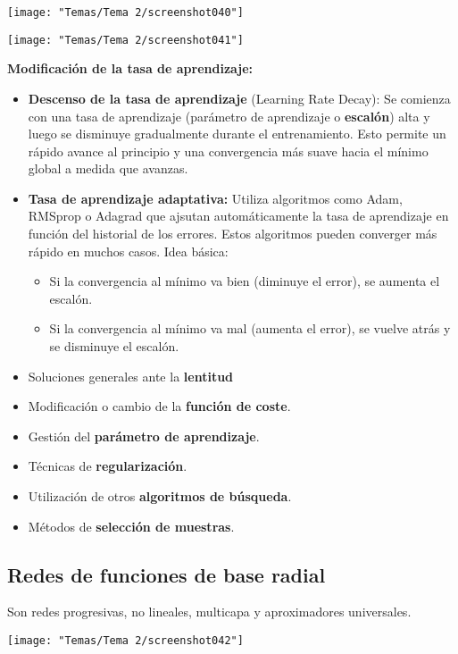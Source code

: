 \begin{center}
	\texttt{[image: "Temas/Tema 2/screenshot040"]}
\end{center}
\begin{center}
	\texttt{[image: "Temas/Tema 2/screenshot041"]}
\end{center}
\textbf{Modificación de la tasa de aprendizaje:}
\begin{itemize}
	\item \textbf{Descenso de la tasa de aprendizaje} (Learning Rate Decay): Se comienza con una tasa de aprendizaje (parámetro de aprendizaje o \textbf{escalón}) alta y luego se disminuye gradualmente durante el entrenamiento. Esto permite un rápido avance al principio y una convergencia más suave hacia el mínimo global a medida que avanzas.
	\item \textbf{Tasa de aprendizaje adaptativa:} Utiliza algoritmos como Adam, RMSprop o Adagrad que ajsutan automáticamente la tasa de aprendizaje en función del historial de los errores. Estos algoritmos pueden converger más rápido en muchos casos. Idea básica:
	\begin{itemize}
		\item Si la convergencia al mínimo va bien (diminuye el error), se aumenta el escalón.
		\item Si la convergencia al mínimo va mal (aumenta el error), se vuelve atrás y se disminuye el escalón.
	\end{itemize}
\end{itemize}
\begin{itemize}[label=\color{red}\textbullet, leftmargin=*]
	\item \color{lightblue}Soluciones generales ante la \textbf{lentitud}
\end{itemize}
\begin{itemize}
	\item Modificación o cambio de la \textbf{función de coste}.
	\item Gestión del \textbf{parámetro de aprendizaje}.
	\item Técnicas de \textbf{regularización}.
	\item Utilización de otros \textbf{algoritmos de búsqueda}.
	\item Métodos de \textbf{selección de muestras}.
\end{itemize}
\subsection{Redes de funciones de base radial}
Son redes progresivas, no lineales, multicapa y aproximadores universales.
\begin{center}
	\texttt{[image: "Temas/Tema 2/screenshot042"]}
\end{center}
